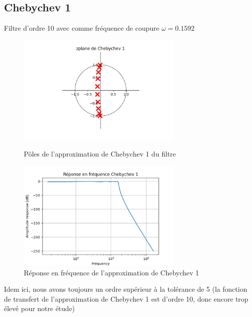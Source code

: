 \documentclass[a4paper,12pt,oneside]{report}	%
\begin{document}
        \subsection{Chebychev 1}
            Filtre d'ordre 10 avec comme fréquence de coupure $\omega = 0.1592$
            \begin{figure}[h!]
                \centering
                \includegraphics[width = 8cm]{images/2.0.0 - zplane de Chebychev 1.png}
                \caption{Pôles de l'approximation de Chebychev 1 du filtre}
                \label{fig:zplane-Chebychev1}
                \includegraphics[width = 8cm]{images/2.0.0 - Réponse en fréquence Chebychev 1.png}
                \caption{Réponse en fréquence de l'approximation de Chebychev 1}
                \label{fig:repfreq-Chebychev1}
            \end{figure}
            
            Idem ici, nous avons toujours un ordre supérieur à la tolérance de 5 (la fonction de transfert de l'approximation de Chebychev 1 est d'ordre 10, donc encore trop élevé pour notre étude)
\newpage
\end{document}
